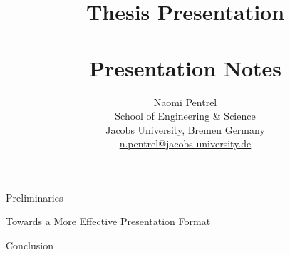 \documentclass[notes,book]{mikoslides}
\title{Thesis Presentation\\
\the\year\\ Presentation Notes}
\author{Naomi Pentrel\\[1ex]
    School of Engineering \& Science\\
    Jacobs University,  Bremen Germany\\
    \url{n.pentrel@jacobs-university.de}}
\begin{document}

\begin{omgroup}{Preliminaries}
\end{omgroup} \newpage

\begin{omgroup}{Towards a More Effective Presentation Format}
\end{omgroup} \newpage

\begin{omgroup}{Conclusion}
\end{omgroup}\newpage
\end{document}
